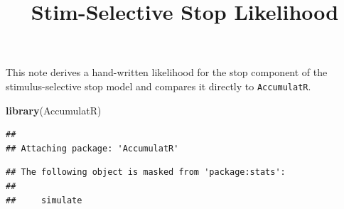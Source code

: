 \documentclass[
]{article}
\title{Stim-Selective Stop Likelihood}
\author{}
\date{\vspace{-2.5em}}
\newenvironment{Shaded}{\begin{snugshade}}{\end{snugshade}}
\newcommand{\FunctionTok}[1]{\textcolor[rgb]{0.13,0.29,0.53}{\textbf{#1}}}
\newcommand{\NormalTok}[1]{#1}
\begin{document}
\maketitle

This note derives a hand-written likelihood for the stop component of
the stimulus-selective stop model and compares it directly to
\texttt{AccumulatR}.

\begin{Shaded}
\begin{Highlighting}[]
\FunctionTok{library}\NormalTok{(AccumulatR)}
\end{Highlighting}
\end{Shaded}

\begin{verbatim}
## 
## Attaching package: 'AccumulatR'
\end{verbatim}

\begin{verbatim}
## The following object is masked from 'package:stats':
## 
##     simulate
\end{verbatim}
\end{document}
